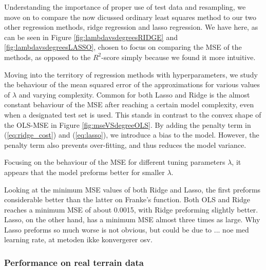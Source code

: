Understanding the importance of proper use of test data and resampling, we move on to compare the now dicussed ordinary least squares method to our two other regression methods, ridge regression and lasso regression. We have here, as can be seen in Figure \ref{fig:lambdavsdegreesRIDGE} and \ref{fig:lambdavsdegreesLASSO}, chosen to focus on comparing the MSE of the methods, as opposed to the $R^2$-score simply because we found it more intuitive.

Moving into the territory of regression methods with hyperparameters, we study the behaviour of the mean squared error of the approximations for various values of $\lambda$ and varying complexity. 
Common for both Lasso and Ridge is the almost constant behaviour of the MSE after reaching a certain model complexity, even when a designated test set is used. This stands in contrast to the convex shape of the OLS-MSE in Figure \ref{fig:mseVSdegreeOLS}. By adding the penalty term in (\ref{eq:ridge_cost}) and (\ref{eq:lasso}), we introduce a bias to the model. However, the penalty term also prevents over-fitting, and thus reduces the model variance. 

Focusing on the behaviour of the MSE for different tuning parameters $\lambda$, it appears that the model preforms better for smaller $\lambda$. 

Looking at the minimum MSE values of both Ridge and Lasso, the first preforms considerable better than the latter on Franke's function. Both OLS and Ridge reaches a minimum MSE of about 0.0015, with Ridge preforming slightly better. Lasso, on the other hand, has a minimum MSE almost three times as large. Why Lasso preforms so much worse is not obvious, but could be due to ... noe med learning rate, at metoden ikke konvergerer osv. 


\subsubsection*{Performance on real terrain data}